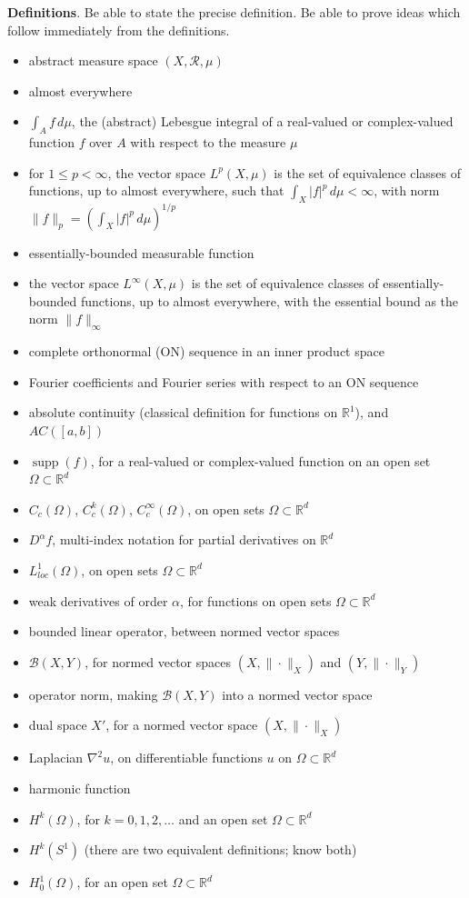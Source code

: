 \documentclass[12pt]{amsart}
\newcommand{\bigspacing}{\renewcommand{\baselinestretch}{1.21}\tiny\normalsize}
\newcommand{\cR}{\mathcal{R}}
\newcommand{\RR}{{\mathbb{R}}}
\begin{document}
\bigspacing
\noindent \textbf{Definitions}.  Be able to state the precise definition.  Be able to prove ideas which follow immediately from the definitions.
\begin{itemize}
\item abstract measure space $(X,\cR,\mu)$
\item almost everywhere
\item $\int_A f\,d\mu$, the (abstract) Lebesgue integral of a real-valued or complex-valued function $f$ over $A$ with respect to the measure $\mu$
\item for $1\le p < \infty$, the vector space $L^p(X,\mu)$ is the set of equivalence classes of functions, up to almost everywhere, such that $\int_X |f|^p\,d\mu<\infty$, with norm $\|f\|_p = \left(\int_X |f|^p\,d\mu\right)^{1/p}$
\item essentially-bounded measurable function
\item the vector space $L^\infty(X,\mu)$ is the set of equivalence classes of essentially-bounded functions, up to almost everywhere, with the essential bound as the norm $\|f\|_\infty$
\item complete orthonormal (ON) sequence in an inner product space
\item Fourier coefficients and Fourier series with respect to an ON sequence
\item absolute continuity (classical definition for functions on $\RR^1$), and $AC([a,b])$
\item $\operatorname{supp}(f)$, for a real-valued or complex-valued function on an open set $\Omega\subset \RR^d$
\item $C_c(\Omega)$, $C_c^k(\Omega)$, $C_c^\infty(\Omega)$, on open sets $\Omega\subset \RR^d$
\item $D^\alpha f$, multi-index notation for partial derivatives on $\RR^d$
\item $L_{loc}^1(\Omega)$, on open sets $\Omega\subset \RR^d$
\item weak derivatives of order $\alpha$, for functions on open sets $\Omega\subset \RR^d$
\item bounded linear operator, between normed vector spaces
\item $\mathcal{B}(X,Y)$, for normed vector spaces $(X,\|\cdot\|_X)$ and $(Y,\|\cdot\|_Y)$
\item operator norm, making $\mathcal{B}(X,Y)$ into a normed vector space
\item dual space $X'$, for a normed vector space $(X,\|\cdot\|_X)$
\item Laplacian $\nabla^2 u$, on differentiable functions $u$ on $\Omega \subset \RR^d$
\item harmonic function
\item $H^k(\Omega)$, for $k=0,1,2,\dots$ and an open set $\Omega\subset \RR^d$
\item $H^k(S^1)$ (there are two equivalent definitions; know both)
\item $H_0^1(\Omega)$, for an open set $\Omega\subset \RR^d$
\end{itemize}
\end{document}
